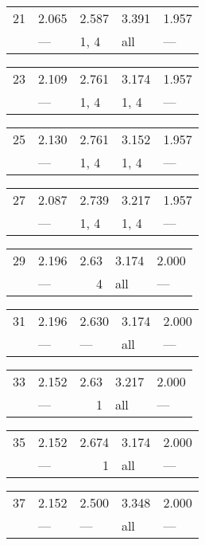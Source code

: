 \begin{tabular}{lllll}
\toprule
 21 & 2.065 & 2.587 & 3.391 & 1.957 \\
    & ---   & 1, 4  & all   & ---   \\
\bottomrule
\end{tabular}
\begin{tabular}{lllll}
\toprule
 23 & 2.109 & 2.761 & 3.174 & 1.957 \\
    & ---   & 1, 4  & 1, 4  & ---   \\
\bottomrule
\end{tabular}
\begin{tabular}{lllll}
\toprule
 25 & 2.130 & 2.761 & 3.152 & 1.957 \\
    & ---   & 1, 4  & 1, 4  & ---   \\
\bottomrule
\end{tabular}
\begin{tabular}{lllll}
\toprule
 27 & 2.087 & 2.739 & 3.217 & 1.957 \\
    & ---   & 1, 4  & 1, 4  & ---   \\
\bottomrule
\end{tabular}
\begin{tabular}{llrll}
\toprule
 29 & 2.196 & 2.63 & 3.174 & 2.000 \\
    & ---   & 4    & all   & ---   \\
\bottomrule
\end{tabular}
\begin{tabular}{lllll}
\toprule
 31 & 2.196 & 2.630 & 3.174 & 2.000 \\
    & ---   & ---   & all   & ---   \\
\bottomrule
\end{tabular}
\begin{tabular}{llrll}
\toprule
 33 & 2.152 & 2.63 & 3.217 & 2.000 \\
    & ---   & 1    & all   & ---   \\
\bottomrule
\end{tabular}
\begin{tabular}{llrll}
\toprule
 35 & 2.152 & 2.674 & 3.174 & 2.000 \\
    & ---   & 1     & all   & ---   \\
\bottomrule
\end{tabular}
\begin{tabular}{lllll}
\toprule
 37 & 2.152 & 2.500 & 3.348 & 2.000 \\
    & ---   & ---   & all   & ---   \\
\bottomrule
\end{tabular}
